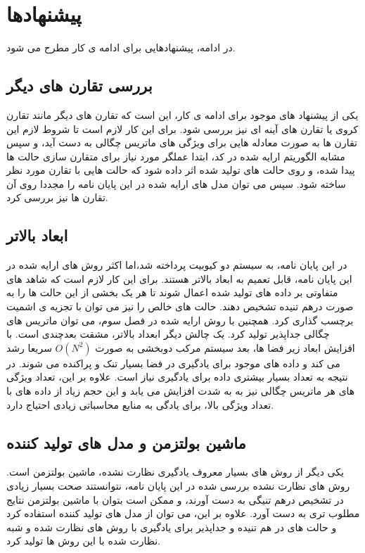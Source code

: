\section{پیشنهادها}

در ادامه، پیشنهادهایی برای ادامه ی کار مطرح می شود.
\subsection{بررسی تقارن های دیگر}
یکی از پیشنهاد های موجود برای ادامه ی کار، این است که تقارن های دیگر مانند تقارن کروی یا تقارن های آینه ای نیز بررسی شود. برای این کار لازم است تا شروط لازم این تقارن ها به صورت معادله هایی برای ویژگی های ماتریس چگالی به دست آید، و سپس مشابه الگوریتم ارایه شده در کد، ابتدا عملگر مورد نیاز برای متقارن سازی حالت ها پیدا شده، و روی حالت های تولید شده اثر داده شود که حالت هایی با تقارن مورد نظر ساخته شود. سپس می توان مدل های ارایه شده در این پایان نامه را مجددا روی آن تقارن ها نیز بررسی کرد.
\subsection{ابعاد بالاتر}
در این پایان نامه، به سیستم دو کیوبیت پرداخته شد،‌اما اکثر روش های ارایه شده در این پایان نامه، قابل تعمیم به ابعاد بالاتر هستند. برای این کار لازم است که شاهد های متفاوتی بر داده های تولید شده اعمال شوند تا هر یک بخشی از این حالت ها را به صورت درهم تنیده تشخیص دهند. حالت های خالص را نیز می توان با تجزیه ی اشمیت برچسب گذاری کرد. همچنین با روش ارایه شده در فصل سوم، می توان ماتریس های چگالی جداپذیر تولید کرد. یک چالش دیگر ابعداد بالاتر، مشقت بعدچندی
است. با افزایش ابعاد زیر فضا ها، بعد سیستم مرکب دوبخشی به صورت
$O(N^2)$
سریعا رشد می کند و داده های موجود برای یادگیری در فضا بسیار تنک و پراکنده می شوند. در نتیجه به تعداد بسیار بیشتری داده برای یادگیری نیاز است. علاوه بر این، تعداد ویژگی های هر ماتریس چگالی نیز به
به شدت افزایش می یابد و این حجم زیاد از داده های با تعداد ویژگی بالا، برای یادگی به منابع محاسباتی زیادی احتیاج دارد.
\subsection{ماشین بولتزمن و مدل های تولید کننده}
یکی دیگر از روش های بسیار معروف یادگیری نظارت نشده، ماشین بولتزمن است. روش های نظارت نشده بررسی شده در این پایان نامه، نتوانستند صحت بسیار زیادی در تشخیص درهم تنیگی به دست آورند، و ممکن است بتوان با ماشین بولتزمن نتایج مطلوب تری به دست آورد. علاوه بر این، می توان از مدل های تولید کننده
استفاده کرد و حالت های در هم تنیده و جداپذیر برای یادگیری با روش های نظارت شده و شبه نظارت شده با این روش ها تولید کرد.‌
